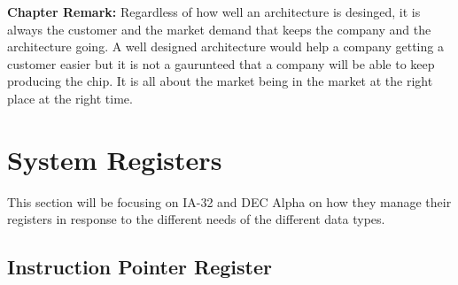 \documentclass[letterpaper,10pt,titlepage]{article}
\begin{document}
\textbf{Chapter Remark:}
Regardless of how well an architecture is desinged, it is always the customer
and the market demand that keeps the company and the architecture going. 
A well designed architecture would help a company getting a customer
easier but it is not a gaurunteed that a company will be able to keep 
producing the chip. It is all about the market being in the market  at the 
right place at the right time.


\section{System Registers}
This section will be focusing on IA-32 and DEC Alpha on how they manage
their registers in response to the different needs of the different data types.
\subsection{Instruction Pointer Register}

\end{document}
